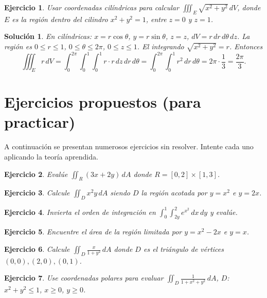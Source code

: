 \documentclass[12pt,spanish]{article}
\newtheorem{ejercicio}{Ejercicio}[section]
\newtheorem{solucion}{Solución}
\begin{document}
\begin{ejercicio}
Usar coordenadas cilíndricas para calcular $\displaystyle\iiint_E \sqrt{x^2+y^2}\,dV$, donde $E$ es la región dentro del cilindro $x^2+y^2=1$, entre $z=0$ y $z=1$.
\end{ejercicio}
\begin{solucion}
En cilíndricas: $x=r\cos\theta$, $y=r\sin\theta$, $z=z$, $dV=r\,dr\,d\theta\,dz$. La región es $0\le r\le1$, $0\le\theta\le2\pi$, $0\le z\le1$. El integrando $\sqrt{x^2+y^2}=r$. Entonces
\[
\iiint_E r\,dV = \int_0^{2\pi}\int_0^1\int_0^1 r\cdot r\,dz\,dr\,d\theta = \int_0^{2\pi}\int_0^1 r^2\,dr\,d\theta = 2\pi\cdot\frac13 = \frac{2\pi}{3}.
\]
\end{solucion}

\section{Ejercicios propuestos (para practicar)}

A continuación se presentan numerosos ejercicios sin resolver. Intente cada uno aplicando la teoría aprendida.

\begin{ejercicio}
Evalúe $\displaystyle\iint_R (3x+2y)\,dA$ donde $R=[0,2]\times[1,3]$.
\end{ejercicio}

\begin{ejercicio}
Calcule $\displaystyle\iint_D x^2y\,dA$ siendo $D$ la región acotada por $y=x^2$ e $y=2x$.
\end{ejercicio}

\begin{ejercicio}
Invierta el orden de integración en $\displaystyle\int_0^1\int_{2y}^2 e^{x^2}\,dx\,dy$ y evalúe.
\end{ejercicio}

\begin{ejercicio}
Encuentre el área de la región limitada por $y=x^2-2x$ e $y=x$.
\end{ejercicio}

\begin{ejercicio}
Calcule $\displaystyle\iint_D \frac{x}{1+y^2}\,dA$ donde $D$ es el triángulo de vértices $(0,0),(2,0),(0,1)$.
\end{ejercicio}

\begin{ejercicio}
Use coordenadas polares para evaluar $\displaystyle\iint_D \frac{1}{1+x^2+y^2}\,dA$, $D$: $x^2+y^2\le1$, $x\ge0$, $y\ge0$.
\end{ejercicio}
\end{document}
